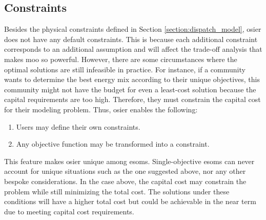 \subsection{Constraints}
\label{section:constraints}

Besides the physical constraints defined in Section \ref{section:dispatch_model},
\ac{osier} does not have any default constraints. This is because each
additional constraint corresponds to an additional assumption and will affect
the trade-off analysis that makes \ac{moo} so powerful. However, there are some
circumstances where the optimal solutions are still
infeasible in practice. For instance, if a community wants to determine the best
energy mix according to their unique objectives, this community might not have
the budget for even a least-cost solution because the capital requirements are
too high. Therefore, they must constrain the capital cost for their modeling
problem. Thus, \ac{osier} enables the following:
\begin{enumerate}
    \item Users may define their own constraints.
    \item Any objective function may be transformed into a constraint.
\end{enumerate}
This feature makes \ac{osier} unique among \acp{esom}.
Single-objective \acp{esom} can never account for unique situations such as the
one suggested above, nor any other bespoke considerations. In the case above,
the capital cost may constrain the problem while still minimizing the total
cost. The solutions under these conditions will have a higher total cost but
could be achievable in the near term due to meeting capital cost requirements.
